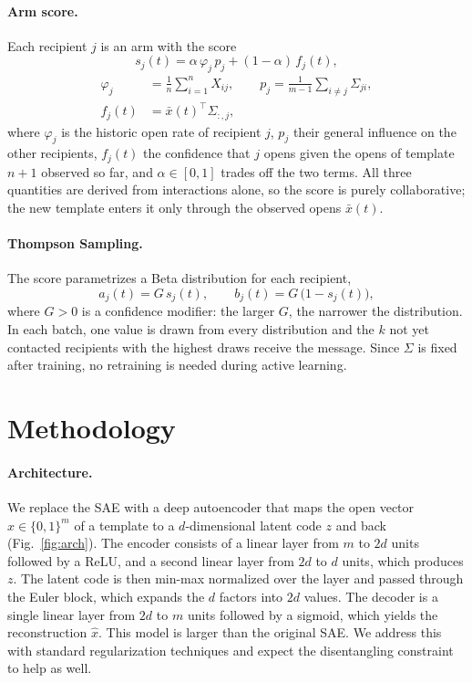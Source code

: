 \documentclass[sigconf]{acmart}
\begin{document}
\paragraph{Arm score.} Each recipient $j$ is an arm with the score
\begin{equation}\label{eq:score}
  s_j(t) = \alpha\, \varphi_j\, p_j + (1-\alpha)\, f_j(t),
\end{equation}
\begin{equation}\label{eq:components}
  \begin{aligned}
    \varphi_j &= \frac{1}{n}\sum_{i=1}^{n} X_{ij}, \qquad
    p_j = \frac{1}{m-1}\sum_{i \neq j} \Sigma_{ji}, \\
    f_j(t) &= \bar{x}(t)^{\top} \Sigma_{:,j},
  \end{aligned}
\end{equation}
where $\varphi_j$ is the historic open rate of recipient $j$, $p_j$ their general
influence on the other recipients, $f_j(t)$ the confidence that $j$ opens given
the opens of template $n+1$ observed so far, and $\alpha \in [0,1]$ trades off the
two terms. All three quantities are derived from interactions alone, so the
score is purely collaborative; the new template enters it only through the
observed opens $\bar{x}(t)$.

\paragraph{Thompson Sampling.} The score parametrizes a Beta distribution for each
recipient,
\begin{equation}\label{eq:ts}
  a_j(t) = G\, s_j(t), \qquad b_j(t) = G\,\bigl(1 - s_j(t)\bigr),
\end{equation}
where $G > 0$ is a confidence modifier: the larger $G$, the narrower the
distribution. In each batch, one value is drawn from every distribution and the
$k$ not yet contacted recipients with the highest draws receive the message.
Since $\Sigma$ is fixed after training, no retraining is needed during active
learning.

\section{Methodology}

\paragraph{Architecture.} We replace the SAE with a deep autoencoder that maps
the open vector $x \in \{0,1\}^m$ of a template to a $d$-dimensional latent code
$z$ and back (Fig.~\ref{fig:arch}). The encoder consists of a linear layer from
$m$ to $2d$ units followed by a ReLU, and a second linear layer from $2d$ to $d$
units, which produces $z$. The latent code is then min-max normalized over the
layer and passed through the Euler block, which expands the $d$ factors into
$2d$ values. The decoder is a single linear layer from $2d$ to $m$ units followed
by a sigmoid, which yields the reconstruction $\hat{x}$.
This model is larger than the original SAE. We address this with
standard regularization techniques and expect the disentangling constraint to
help as well.
\end{document}
